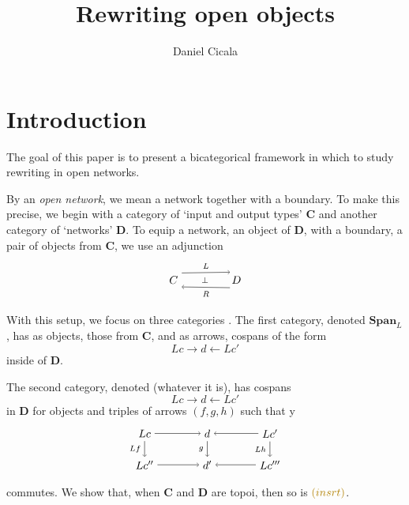 \documentclass{amsart}
\author{Daniel Cicala}
\title{Rewriting open objects}
\newcommand{\cat}[1]{\mathbf{#1}}
\newcommand{\Span}{\mathbf{Span}}
\newcommand{\edit}[1]{\textcolor{editcolour}{(#1)}}
\theoremstyle{remark}
\theoremstyle{definition}
\begin{document}
\maketitle{} 
\section{Introduction} \label{sec:introduction}

The goal of this paper is to present a bicategorical framework in
which to study rewriting in open networks.

By an \emph{open network},
we mean a network together with a boundary.
To make this precise, we
begin with a category of `input and output types' 
$\cat{C}$ 
and another category of `networks' 
$ \cat{D} $.
To equip a network, an object of $\cat{D}$,
with a boundary, a pair of objects from $\cat{C}$,
we use an adjunction
\[ %
\begin{tikzpicture} 
\node (C) at (0,0) {$ C $};
\node (D) at (2,0) {$ D $};
\node at (1,0) {\scriptsize $ \perp $};
\draw [->] (C.40) to 
node [above] {\scriptsize $ L $} (D.130);
\draw [<-] (C.-40) to 
node [below] {\scriptsize $ R $} (D.-130);
\end{tikzpicture}
\]
With this setup, we focus on three categories
.
The first category, denoted 
$ \Span_L $,
has as objects, those from $ \cat{C} $,
and as arrows, cospans of the form
\[
Lc \to d \gets Lc'
\]
inside of $ \cat{D} $. 

The second category, denoted
\edit{whatever it is},
has cospans
\[
Lc \to d \gets Lc'
\]
in $ \cat{ D } $ for objects and
triples of arrows $ ( f , g , h ) $
such that 
y\[  %
\begin{tikzpicture}
\node (Lc) at (-2,1) {$ Lc $};
\node (d) at (0,1) {$ d $};
\node (Lc') at (2,1) {$ Lc' $};
\node (Lc'') at (-2,0) {$ Lc'' $};
\node (d') at (0,0) {$ d' $};
\node (Lc''') at (2,0) {$ Lc''' $};
\draw [->] (Lc) to (d);
\draw [->] (Lc') to (d);
\draw [->] (Lc'') to (d');
\draw [->] (Lc''') to (d');
\draw [->] (Lc) to node [left] {\scriptsize $ Lf $ } (Lc'');
\draw [->] (d) to node [left] { \scriptsize $ g $ }(d');
\draw [->] (Lc') to node [left] { \scriptsize $ Lh $ }(Lc''');
\end{tikzpicture}
\]
commutes.
We show that, when $ \cat{C} $ and
$ \cat{D} $ are topoi, then so is $ \edit{insrt} $.
\end{document}
